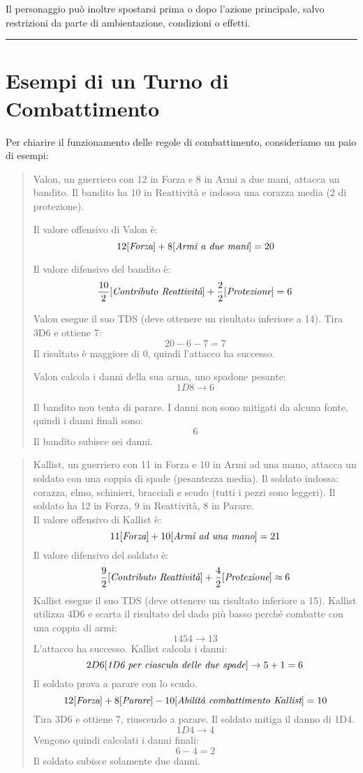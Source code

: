\documentclass[../manuale_main.tex]{subfiles}
\begin{document}
Il personaggio può inoltre spostarsi prima o dopo l’azione principale, salvo restrizioni da parte di ambientazione, condizioni o effetti.


\vspace{0.5cm}
\noindent
\begin{center}
\rule{\textwidth}{0.4pt} 
\end{center}
\vspace{0.5cm}

\section{Esempi di un Turno di Combattimento}
Per chiarire il funzionamento delle regole di combattimento, consideriamo un paio di esempi:

\begin{quote}
Valon, un guerriero con 12 in Forza e 8 in Armi a due mani, attacca un bandito. Il bandito ha 10 in Reattività e indossa una corazza media (2 di protezione).

Il valore offensivo di Valon è:
\[
12 [\emph{Forza}] + 8 [\emph{Armi a due mani}] = 20
\]

Il valore difensivo del bandito è:
\[
\frac{10}{2} [\emph{Contributo Reattività}] + \frac{2}{2} [\emph{Protezione}] = 6
\]

Valon esegue il suo TDS (deve ottenere un risultato inferiore a 14). Tira 3D6 e ottiene 7:
\[
20 - 6 - 7 = 7
\]
Il risultato è maggiore di 0, quindi l’attacco ha successo.

Valon calcola i danni della sua arma, uno spadone pesante:
\[
1D8 \rightarrow 6
\]

Il bandito non tenta di parare. I danni non sono mitigati da alcuna fonte, quindi i danni finali sono:
\[
6
\]
Il bandito subisce sei danni.
\end{quote}


\begin{quote}
Kallist, un guerriero con 11 in Forza e 10 in Armi ad una mano, attacca un soldato con una coppia di spade (pesantezza media). Il soldato indossa: corazza, elmo, schinieri, bracciali e scudo (tutti i pezzi sono leggeri). Il soldato ha 12 in Forza, 9 in Reattività, 8 in Parare.\\
Il valore offensivo di Kallist è:
\[
11 [\emph{Forza}] + 10 [\emph{Armi ad una mano}] = 21
\]
 Il valore difensivo del soldato è:
\[
\frac{9}{2} [\emph{Contributo Reattività}] + \frac{4}{2} [\emph{Protezione}] \approx 6
\]
Kallist esegue il suo TDS (deve ottenere un risultato inferiore a 15). Kallist utilizza 4D6 e scarta il risultato del dado più basso perché combatte con una coppia di armi:
\[
1 4 5 4 \rightarrow 13 
\]
L'attacco ha successo. Kallist calcola i danni:\\
\[
2D6 [\emph{1D6 per ciascula delle due spade}] \rightarrow 5 + 1 = 6
\]
Il soldato prova a parare con lo scudo.
\[
12 [\emph{Forza}] + 8 [\emph{Parare}] - 10 [\emph{Abilità combattimento Kallist}] = 10
\]
Tira 3D6 e ottiene 7, riuscendo a parare. Il soldato mitiga il danno di 1D4.\\
\[
1D4 \rightarrow 4
\]
Vengono quindi calcolati i danni finali:
\[
6 - 4 = 2
\]
Il soldato subisce solamente due danni.
\end{quote}
\end{document}
